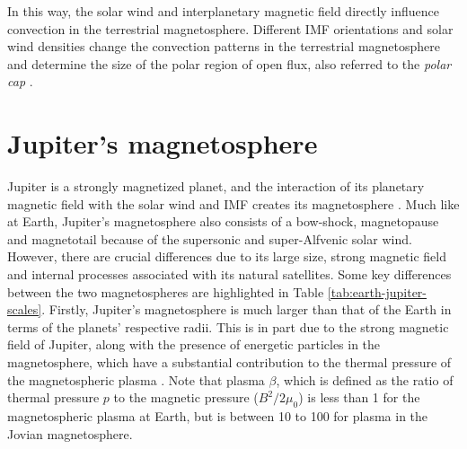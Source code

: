 In this way, the solar wind and interplanetary magnetic field directly influence convection in the terrestrial magnetosphere. Different IMF orientations and solar wind densities change the convection patterns in the terrestrial magnetosphere and determine the size of the polar region of open flux,  also referred to the \emph{polar cap} \cite{Heelis1984TheConvection,Milan2008ResponseOnset}. 

\section{Jupiter's magnetosphere}

Jupiter is a strongly magnetized planet, and the interaction of its planetary magnetic field with the solar wind and IMF creates its magnetosphere \cite{Krupp2004DynamicsMagnetosphere}. Much like at Earth, Jupiter's magnetosphere also consists of a bow-shock, magnetopause and magnetotail because of the supersonic and super-Alfvenic solar wind. However, there are crucial differences due to its large size, strong magnetic field and internal processes associated with its natural satellites. Some key differences between the two magnetospheres are highlighted in Table \ref{tab:earth-jupiter-scales}. Firstly, Jupiter's magnetosphere is much larger than that of the Earth in terms of the planets' respective radii. This is in part due to the strong magnetic field of Jupiter, along with the presence of energetic particles in the magnetosphere, which have a substantial contribution to the thermal pressure of the magnetospheric plasma \cite{Bagenal2011b}. Note that plasma $\beta$, which is defined as the ratio of thermal pressure $p$ to the magnetic pressure ($B^2/2\mu_0$) is less than 1 for the magnetospheric plasma at Earth, but is between 10 to 100 for plasma in the Jovian magnetosphere.

